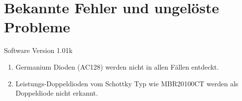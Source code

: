 
\chapter{Bekannte Fehler und ungel\"oste Probleme}
{\center Software Version 1.01k}

\begin{enumerate}

\item Germanium Dioden (AC128) werden nicht in allen F\"allen entdeckt.
\item Leistungs-Doppeldioden vom Schottky Typ wie MBR20100CT werden als Doppeldiode nicht erkannt.

\end{enumerate}
